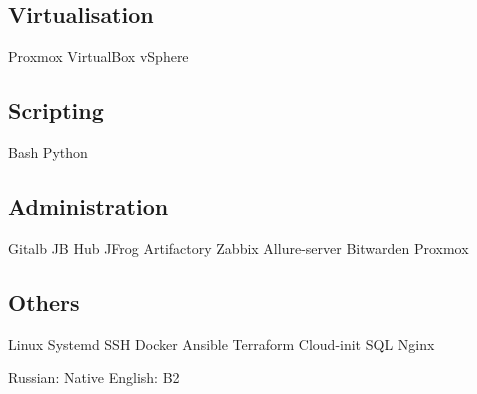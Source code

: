 \documentclass[a4paper]{MagicalCV}
\begin{document}
\begin{minipage}[t]{0.33\textwidth}
\subsection{Virtualisation}
Proxmox \textbullet{} 
VirtualBox \textbullet{} 
vSphere 
\subsection{Scripting}
Bash \textbullet{} 
Python
\subsection{Administration}
Gitalb \textbullet{} 
JB Hub \textbullet{} 
JFrog Artifactory \textbullet{} 
Zabbix \textbullet{} 
Allure-server \textbullet{} 
Bitwarden \textbullet{} 
Proxmox
\subsection{Others}
Linux \textbullet{} 
Systemd \textbullet{} 
SSH \textbullet{} 
Docker \textbullet{} 
Ansible \textbullet{} 
Terraform \textbullet{} 
Cloud-init \textbullet{} 
SQL \textbullet{} 
Nginx
\sectionsep


Russian: Native \textbullet{} English: B2
\sectionsep

\end{minipage} 
\hfill
\end{document}
